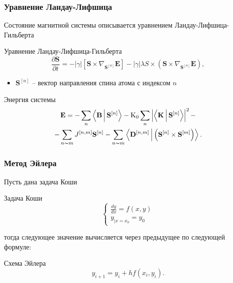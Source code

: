 \documentclass[t]{beamer}
\newcommand*{\Sn}{\ensuremath{\mathbf{S}^{[n]}}}
\begin{document}
\begin{frame}
    \frametitle{Уравнение Ландау-Лифшица}
    Состояние магнитной системы описывается уравнением Ландау-Лифшица-Гильберта
    \begin{block}{Уравнение Ландау-Лифшица-Гильберта}
        \begin{equation*}
            \frac{\partial \mathbf{S}}{\partial t} = - |\gamma|\left[\mathbf{S}
            \times\nabla_{\Sn}\mathbf E\right]-
            |\gamma|\lambda S \times \left( \mathbf S \times
            \nabla_{\Sn}\mathbf E \right),
        \end{equation*}
    \end{block}

    \begin{itemize}
        \item $\Sn$ -- вектор направления спина атома с индексом $n$%
    \end{itemize}

    \pause

    \begin{block}{Энергия системы}
        \begin{multline*}
            \mathbf E = -\sum_n \Braket{\mathbf B | \Sn} - \mathrm{K_0} \sum_n
            \left| \Braket{\mathbf K | \Sn } \right|^2
            -\\-
            \sum_{n\thicksim m} J^{[n,m]} \Sn - \sum_{n\thicksim m}
            \Braket{\mathbf D^{[n,m]} | \left(\Sn \times \mathbf S^{[m]}\right)}.
        \end{multline*}
    \end{block}
\end{frame}


\begin{frame}
    \frametitle{Метод Эйлера}
    Пусть дана задача Коши
    \begin{block}{Задача Коши}
        \begin{equation*}
            \begin{cases}
                \frac{dy}{dx} = f(x,y) \\
                y_{|x=x_0} = y_0
            \end{cases}
        \end{equation*}
    \end{block}
    тогда следующее значение вычисляется через предыдущее по следующей формуле:
    \begin{block}{Схема Эйлера}
        \begin{equation*}
            y_{i+1} = y_i + hf(x_i, y_i).
        \end{equation*}
    \end{block}
\end{frame}
\end{document}
